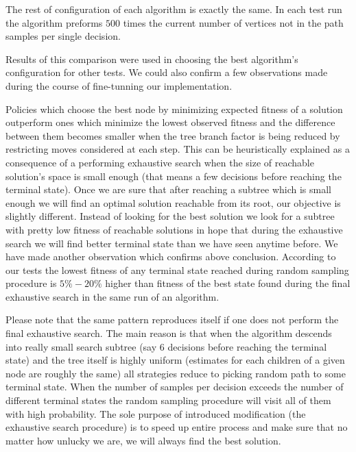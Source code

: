 The rest of configuration of each algorithm is exactly the same. In each test
run the algorithm preforms $500$ times the current number of vertices not in
the path samples per single decision.

\begin{figure}[ht]
  \centering
  
\end{figure}

\begin{figure}[ht]
  \centering
  
\end{figure}

\begin{figure}[ht]
  \centering
  
\end{figure}

Results of this comparison were used in choosing the best algorithm's
configuration for other tests. We could also confirm a few observations made
during the course of fine-tunning our implementation.

Policies which choose the best node by minimizing expected fitness of a
solution outperform ones which minimize the lowest observed fitness and the
difference between them becomes smaller when the tree branch factor is being
reduced by restricting moves considered at each step. This can be heuristically
explained as a consequence of a performing exhaustive search when the size of
reachable solution's space is small enough (that means a few decisions before
reaching the terminal state). Once we are sure that after reaching a subtree
which is small enough we will find an optimal solution reachable from its root,
our objective is slightly different. Instead of looking for the best solution
we look for a subtree with pretty low fitness of reachable solutions in hope
that during the exhaustive search we will find better terminal state than we
have seen anytime before. We have made another observation which confirms above
conclusion. According to our tests the lowest fitness of any terminal state
reached during random sampling procedure is $5\% - 20\%$ higher than fitness of
the best state found during the final exhaustive search in the same run of an
algorithm.

Please note that the same pattern reproduces itself if one does not perform the
final exhaustive search. The main reason is that when the algorithm descends
into really small search subtree (say $6$ decisions before reaching the
terminal state) and the tree itself is highly uniform (estimates for each
children of a given node are roughly the same) all strategies reduce to picking
random path to some terminal state. When the number of samples per decision
exceeds the number of different terminal states the random sampling procedure
will visit all of them with high probability. The sole purpose of introduced
modification (the exhaustive search procedure) is to speed up entire process
and make sure that no matter how unlucky we are, we will always find the best
solution.

